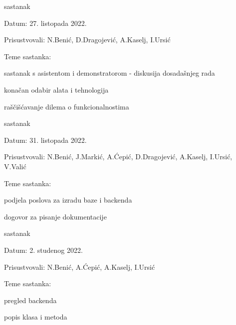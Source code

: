\begin{packed_enum}
			\item  sastanak
			\item[] \begin{packed_item}
				\item Datum: 27. listopada 2022.
				\item Prisustvovali: N.Benić, D.Dragojević, A.Kaselj, I.Ursić
				\item Teme sastanka:
				\begin{packed_item}
					\item  sastanak s asistentom i demonstratorom - diskusija dosadašnjeg rada
					\item  konačan odabir alata i tehnologija
					\item  raščišćavanje dilema o funkcionalnostima
				\end{packed_item}
			\end{packed_item}
		
			\item  sastanak
			\item[] \begin{packed_item}
				\item Datum: 31. listopada 2022.
				\item Prisustvovali: N.Benić, J.Markić, A.Ćepić, D.Dragojević, A.Kaselj, I.Ursić, V.Valić
				\item Teme sastanka:
				\begin{packed_item}
					\item  podjela poslova za izradu baze i backenda
					\item  dogovor za pisanje dokumentacije
				\end{packed_item}
			\end{packed_item}

                \item  sastanak
			\item[] \begin{packed_item}
				\item Datum: 2. studenog 2022.
				\item Prisustvovali: N.Benić, A.Ćepić, A.Kaselj, I.Ursić
				\item Teme sastanka:
				\begin{packed_item}
					\item  pregled backenda
					\item  popis klasa i metoda
				\end{packed_item}
			\end{packed_item}


\end{packed_enum}
